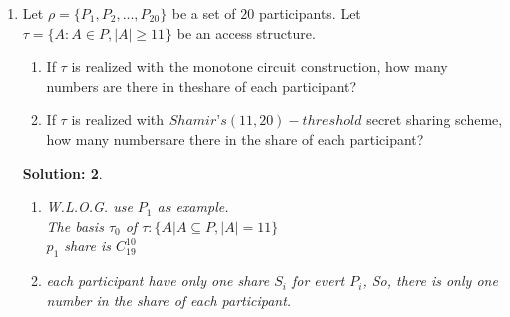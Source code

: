 \documentclass{article}
\theoremstyle{break}
\newtheorem*{solution*}{\textbf{Solution:} }
\begin{document}
\begin{enumerate}
\begin{solution*}
\begin{center}
\begin{tabular}{|c|c|}
                        \hline
                        $p_2$ & $s-a_1,d_1,e_1,f_1$\\
                        \hline
                        $p_3$ & $s-b_1, d_2, e_2, g_1$\\
                        \hline
                        $p_4$ & $c_2, s-d_1-d_2, f_2,g_2$\\
                        \hline
                        $p_5$ & $s-c_1-c_2, s-e_1-e_2, s-f_1-f_2, s-g_1-g_2$\\
                        \hline
                \end{tabular}    
                \end{center}
        \end{solution*}
        \vspace{20mm}
        \item Let $\rho =\{P_1, P_2, . . . , P_{20}\}$ be a set of $20$ participants.  Let $\tau =\{ A:A \in P,|A|\geq11\}$ be an access structure.
        \begin{enumerate}
                \item If $\tau$ is realized with the monotone circuit construction, how many numbers are there in theshare of each participant?
                \item If $\tau$ is realized with $Shamir’s (11,20)-threshold$ secret sharing scheme, how many numbersare there in the share of each participant?
        \end{enumerate}
        \begin{solution*}
                \leavevmode\\
                \begin{enumerate}
                        \item W.L.O.G. use $P_1$ as example.\\
                        The basis $\tau_0$ of $\tau: \{ A | A \subseteq P, |A| = 11 \}$ \\
                        $p_1$ share is $C_{19}^{10}$
                        \item each participant have only one share $S_i$ for evert $P_i$, So, there is only one number in the share of each participant.
                \end{enumerate}
        \end{solution*}
\end{enumerate}
\end{document}
